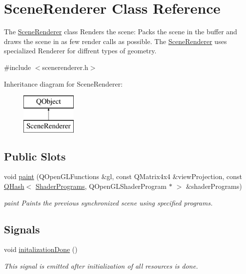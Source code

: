 \hypertarget{class_scene_renderer}{\section{Scene\+Renderer Class Reference}
\label{class_scene_renderer}
}


The \hyperlink{class_scene_renderer}{Scene\+Renderer} class  Renders the scene\+: Packs the scene in the buffer and draws the scene in as few render calls as possible. The \hyperlink{class_scene_renderer}{Scene\+Renderer} uses specialized Renderer for diffrent types of geometry.  




{\ttfamily \#include $<$scenerenderer.\+h$>$}

Inheritance diagram for Scene\+Renderer\+:\begin{figure}[H]
\begin{center}
\leavevmode
\includegraphics[height=2.000000cm]{class_scene_renderer}
\end{center}
\end{figure}
\subsection*{Public Slots}
\begin{DoxyCompactItemize}
\item 
void \hyperlink{class_scene_renderer_a91177b285ac9fba685e8409671eac1e7}{paint} (Q\+Open\+G\+L\+Functions \&gl, const Q\+Matrix4x4 \&view\+Projection, const \hyperlink{singleton_q_hash}{Q\+Hash}$<$ \hyperlink{shaderprograms_8h_ada89718f8d394b2cc093eb9770c554ff}{Shader\+Programs}, Q\+Open\+G\+L\+Shader\+Program $\ast$ $>$ \&shader\+Programs)
\begin{DoxyCompactList}\small\item\em paint Paints the previous synchronized scene using specified programs. \end{DoxyCompactList}\end{DoxyCompactItemize}
\subsection*{Signals}
\begin{DoxyCompactItemize}
\item 
void \hyperlink{class_scene_renderer_a9ea8f56371c7758519c5e6541519d988}{initalization\+Done} ()
\begin{DoxyCompactList}\small\item\em This signal is emitted after initialization of all resources is done. \end{DoxyCompactList}\end{DoxyCompactItemize}
